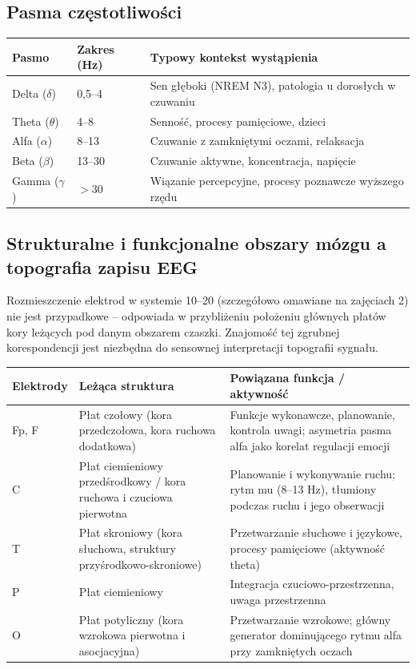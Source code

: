 \documentclass[11pt,a4paper]{article}
\begin{document}
\subsection{Pasma częstotliwości}
\begin{center}
\begin{tabular}{@{}lll@{}}
\toprule
\textbf{Pasmo} &
\textbf{Zakres (Hz)} &
\textbf{Typowy kontekst wystąpienia}\\
\midrule
Delta ($\delta$) & 0,5--4 & Sen głęboki (NREM N3), patologia u dorosłych w czuwaniu\\
Theta ($\theta$) & 4--8 & Senność, procesy pamięciowe, dzieci\\
Alfa ($\alpha$) & 8--13 & Czuwanie z zamkniętymi oczami, relaksacja\\
Beta ($\beta$) & 13--30 & Czuwanie aktywne, koncentracja, napięcie\\
Gamma ($\gamma$) & $>$30 & Wiązanie percepcyjne, procesy poznawcze wyższego rzędu\\
\bottomrule
\end{tabular}
\end{center}

\subsection{Strukturalne i funkcjonalne obszary mózgu a topografia zapisu EEG}
Rozmieszczenie elektrod w systemie 10--20 (szczegółowo omawiane na zajęciach 2) nie jest przypadkowe -- odpowiada w przybliżeniu położeniu głównych płatów kory leżących pod danym obszarem czaszki. Znajomość tej zgrubnej korespondencji jest niezbędna do sensownej interpretacji topografii sygnału.

\begin{center}
\begin{tabular}{p{} p{} p{}}
\toprule
\textbf{Elektrody} &
\textbf{Leżąca struktura} &
\textbf{Powiązana funkcja / aktywność} \\
\midrule
Fp, F & Płat czołowy (kora przedczołowa, kora ruchowa dodatkowa) & Funkcje wykonawcze, planowanie, kontrola uwagi; asymetria pasma alfa jako korelat regulacji emocji\\
C & Płat ciemieniowy przedśrodkowy / kora ruchowa i czuciowa pierwotna & Planowanie i wykonywanie ruchu; rytm mu (8--13 Hz), tłumiony podczas ruchu i jego obserwacji\\
T & Płat skroniowy (kora słuchowa, struktury przyśrodkowo-skroniowe) & Przetwarzanie słuchowe i językowe, procesy pamięciowe (aktywność theta)\\
P & Płat ciemieniowy & Integracja czuciowo-przestrzenna, uwaga przestrzenna\\
O & Płat potyliczny (kora wzrokowa pierwotna i asocjacyjna) & Przetwarzanie wzrokowe; główny generator dominującego rytmu alfa przy zamkniętych oczach\\
\bottomrule
\end{tabular}
\end{center}
\end{document}
